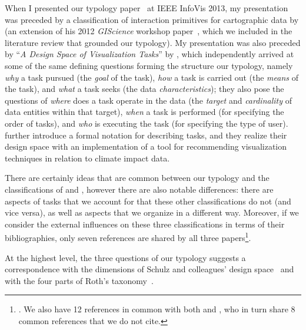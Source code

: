 
When I presented our typology paper~\cite{Brehmer2013} at IEEE InfoVis 2013, my presentation was preceded by a classification of interaction primitives for cartographic data by \citet{Roth2013} (an extension of his 2012 {\it GIScience} workshop paper~\cite{Roth2012}, which we included in the literature review that grounded our typology).
My presentation was also preceded by ``{\it A Design Space of Visualization Tasks}'' by \citet{Schulz2013}, which independently arrived at some of the same defining questions forming the structure our typology, namely {\it why} a task pursued (the {\it goal} of the task), {\it how} a task is carried out (the {\it means} of the task), and {\it what} a task seeks (the data {\it characteristics}); they also pose the questions of {\it where} does a task operate in the data (the {\it target} and {\it cardinality} of data entities within that target), {\it when} a task is performed (for specifying the order of tasks), and {\it who} is executing the task (for specifying the type of user). \citet{Schulz2013} further introduce a formal notation for describing tasks, and they realize their design space with an implementation of a tool for recommending visualization techniques in relation to climate impact data.

There are certainly ideas that are common between our typology and the classifications of \citet{Roth2013} and \citet{Schulz2013}, however there are also notable differences: there are aspects of tasks that we account for that these other classifications do not (and vice versa), as well as aspects that we organize in a different way.
Moreover, if we consider the external influences on these three classifications in terms of their bibliographies, only seven references are shared by all three papers\footnote{\citet{Amar2005,Chuah1996,Pirolli2005,Shneiderman1996,Wehrend1990,Yi2007,Zhou1998}. We also have 12 references in common with both \citet{Roth2013} and \citet{Schulz2013}, who in turn share 8 common references that we do not cite.}.

At the highest level, the three questions of our typology suggests a correspondence with the dimensions of Schulz and colleagues' design space~\cite{Schulz2013} and with the four parts of Roth's taxonomy~\cite{Roth2013}.

